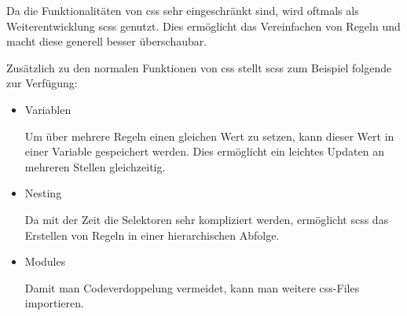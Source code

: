 Da die Funktionalitäten von \gls{css} sehr eingeschränkt sind, wird oftmals als Weiterentwicklung \gls{scss} genutzt. Dies ermöglicht das Vereinfachen von Regeln und macht diese generell besser überschaubar.

Zusätzlich zu den normalen Funktionen von \gls{css} stellt \gls{scss} zum Beispiel folgende zur Verfügung: \cite{SCSS}

\begin{itemize}
    \item Variablen

          Um über mehrere Regeln einen gleichen Wert zu setzen, kann dieser Wert in einer Variable gespeichert werden. Dies ermöglicht ein leichtes Updaten an mehreren Stellen gleichzeitig.

    \item Nesting

          Da mit der Zeit die Selektoren sehr kompliziert werden, ermöglicht \gls{scss} das Erstellen von Regeln in einer hierarchischen Abfolge.

    \item Modules

          Damit man Codeverdoppelung vermeidet, kann man weitere \gls{css}-Files importieren.
\end{itemize}